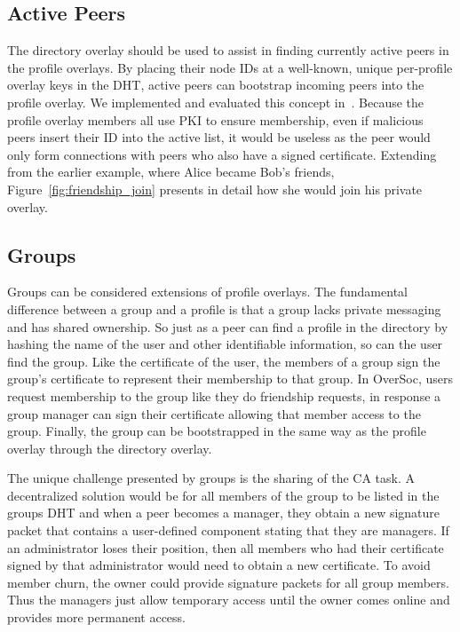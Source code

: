 \documentclass{IEEEtran}
\begin{document}
\subsection{Active Peers}

The directory overlay should be used to assist in finding currently active
peers in the profile overlays.  By placing their node IDs at a well-known,
unique per-profile overlay keys in the DHT, active peers can bootstrap incoming
peers into the profile overlay.  We implemented and evaluated this concept
in~\cite{vpo}.  Because the profile overlay members all use PKI to ensure
membership, even if malicious peers insert their ID into the active list, it
would be useless as the peer would only form connections with peers who also
have a signed certificate.  Extending from the earlier example, where Alice
became Bob's friends, Figure~\ref{fig:friendship_join} presents in detail how
she would join his private overlay.

\subsection{Groups}

Groups can be considered extensions of profile overlays.  The fundamental
difference between a group and a profile is that a group lacks private
messaging and has shared ownership.  So just as a peer can find a profile in
the directory by hashing the name of the user and other identifiable
information, so can the user find the group.  Like the certificate of the user,
the members of a group sign the group's certificate to represent their
membership to that group.  In OverSoc, users request membership to the group
like they do friendship requests, in response a group manager can sign their
certificate allowing that member access to the group.  Finally, the group can
be bootstrapped in the same way as the profile overlay through the directory
overlay.

The unique challenge presented by groups is the sharing of the CA task.  A
decentralized solution would be for all members of the group to be listed in
the groups DHT and when a peer becomes a manager, they obtain a new signature
packet that contains a user-defined component stating that they are managers.
If an administrator loses their position, then all members who had their
certificate signed by that administrator would need to obtain a new
certificate.  To avoid member churn, the owner could provide signature packets
for all group members.  Thus the managers just allow temporary access until the
owner comes online and provides more permanent access.
\end{document}
